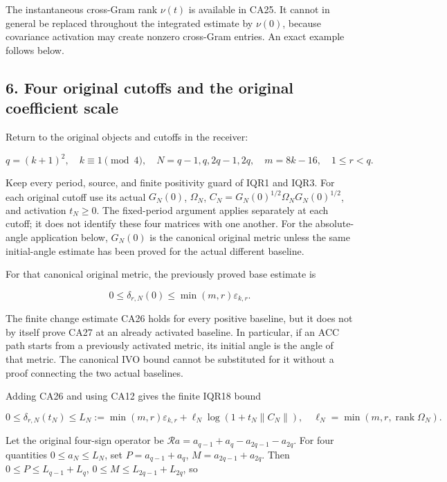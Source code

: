 The instantaneous cross-Gram rank \(\nu(t)\) is available in CA25. It cannot in general be replaced throughout the integrated estimate by \(\nu(0)\), because covariance activation may create nonzero cross-Gram entries. An exact example follows below.

\subsection{6. Four original cutoffs and the original coefficient scale}\label{four-original-cutoffs-and-the-original-coefficient-scale}

Return to the original objects and cutoffs in the receiver:

\[
q=(k+1)^2,\quad k\equiv1\pmod4,\quad
N=q-1,q,2q-1,2q,\quad
m=8k-16,\quad 1\le r<q.
\]

Keep every period, source, and finite positivity guard of IQR1 and IQR3. For each original cutoff use its actual \(G_N(0)\), \(\Omega_N\), \(C_N=G_N(0)^{1/2}\Omega_NG_N(0)^{1/2}\), and activation \(t_N\ge0\). The fixed-period argument applies separately at each cutoff; it does not identify these four matrices with one another. For the absolute-angle application below, \(G_N(0)\) is the canonical original metric unless the same initial-angle estimate has been proved for the actual different baseline.

For that canonical original metric, the previously proved base estimate is

\[
0\le\delta_{r,N}(0)\le\min(m,r)\varepsilon_{k,r}.
\tag{CA27}
\]

The finite change estimate CA26 holds for every positive baseline, but it does not by itself prove CA27 at an already activated baseline. In particular, if an ACC path starts from a previously activated metric, its initial angle is the angle of that metric. The canonical IVO bound cannot be substituted for it without a proof connecting the two actual baselines.

Adding CA26 and using CA12 gives the finite IQR18 bound

\[
0\le\delta_{r,N}(t_N)\le
L_N:=\min(m,r)\varepsilon_{k,r}
+\ell_N\log(1+t_N\|C_N\|),
\quad \ell_N=\min(m,r,\operatorname{rank}\Omega_N).
\tag{CA28}
\]

Let the original four-sign operator be \(\mathcal Ra=a_{q-1}+a_q-a_{2q-1}-a_{2q}\). For four quantities \(0\le a_N\le L_N\), set \(P=a_{q-1}+a_q\), \(M=a_{2q-1}+a_{2q}\). Then \(0\le P\le L_{q-1}+L_q\), \(0\le M\le L_{2q-1}+L_{2q}\), so

